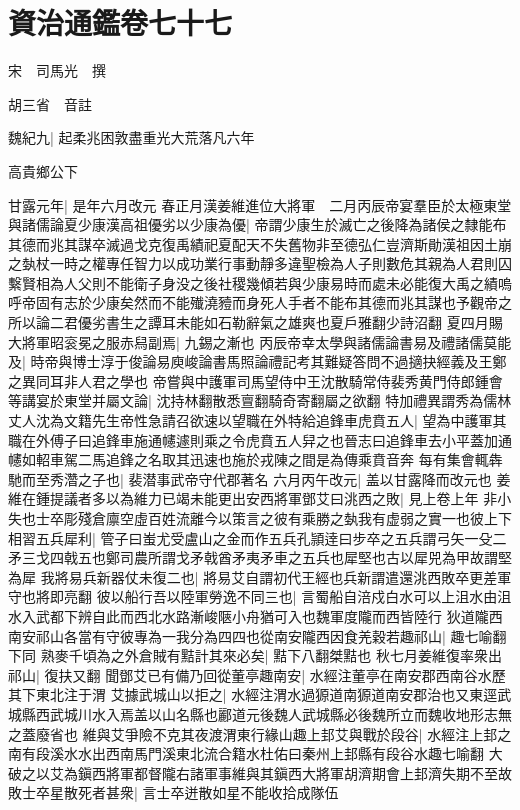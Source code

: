 \chapter{資治通鑑卷七十七}
宋　司馬光　撰

胡三省　音註

魏紀九|{
	起柔兆困敦盡重光大荒落凡六年}


高貴鄉公下

甘露元年|{
	是年六月改元}
春正月漢姜維進位大將軍　二月丙辰帝宴羣臣於太極東堂與諸儒論夏少康漢高祖優劣以少康為優|{
	帝謂少康生於滅亡之後降為諸侯之隸能布其德而兆其謀卒滅過戈克復禹績祀夏配天不失舊物非至德弘仁豈濟斯勛漢祖因土崩之埶杖一時之權專任智力以成功業行事動靜多違聖檢為人子則數危其親為人君則囚繫賢相為人父則不能衛子身没之後社稷幾傾若與少康易時而處未必能復大禹之績嗚呼帝固有志於少康矣然而不能殱澆豷而身死人手者不能布其德而兆其謀也予觀帝之所以論二君優劣書生之譚耳未能如石勒辭氣之雄爽也夏戶雅翻少詩沼翻}
夏四月賜大將軍昭衮冕之服赤舄副焉|{
	九錫之漸也}
丙辰帝幸太學與諸儒論書易及禮諸儒莫能及|{
	時帝與博士淳于俊論易庾峻論書馬照論禮記考其難疑答問不過擿抉經義及王鄭之異同耳非人君之學也}
帝嘗與中護軍司馬望侍中王沈散騎常侍裴秀黄門侍郎鍾會等講宴於東堂并屬文論|{
	沈持林翻散悉亶翻騎奇寄翻屬之欲翻}
特加禮異謂秀為儒林丈人沈為文籍先生帝性急請召欲速以望職在外特給追鋒車虎賁五人|{
	望為中護軍其職在外傅子曰追鋒車施通幰遽則乘之令虎賁五人舁之也晉志曰追鋒車去小平蓋加通幰如軺車駕二馬追鋒之名取其迅速也施於戎陳之間是為傳乘賁音奔}
每有集會輒犇馳而至秀濳之子也|{
	裴潜事武帝守代郡著名}
六月丙午改元|{
	盖以甘露降而改元也}
姜維在鍾提議者多以為維力已竭未能更出安西將軍鄧艾曰洮西之敗|{
	見上卷上年}
非小失也士卒彫殘倉廪空虛百姓流離今以策言之彼有乘勝之埶我有虚弱之實一也彼上下相習五兵犀利|{
	管子曰蚩尤受盧山之金而作五兵孔頴逹曰步卒之五兵謂弓矢一殳二矛三戈四戟五也鄭司農所謂戈矛戟酋矛夷矛車之五兵也犀堅也古以犀兕為甲故謂堅為犀}
我將易兵新器仗未復二也|{
	將易艾自謂初代王經也兵新謂遣還洮西敗卒更差軍守也將即亮翻}
彼以船行吾以陸軍勞逸不同三也|{
	言蜀船自涪戍白水可以上沮水由沮水入武都下辨自此而西北水路漸峻陿小舟猶可入也魏軍度隴而西皆陸行}
狄道隴西南安祁山各當有守彼專為一我分為四四也從南安隴西因食羌穀若趣祁山|{
	趣七喻翻下同}
熟麥千頃為之外倉賊有黠計其來必矣|{
	黠下八翻桀黠也}
秋七月姜維復率衆出祁山|{
	復扶又翻}
聞鄧艾已有備乃回從董亭趣南安|{
	水經注董亭在南安郡西南谷水歷其下東北注于渭}
艾據武城山以拒之|{
	水經注渭水過獂道南獂道南安郡治也又東逕武城縣西武城川水入焉盖以山名縣也酈道元後魏人武城縣必後魏所立而魏收地形志無之蓋廢省也}
維與艾爭險不克其夜渡渭東行緣山趣上邽艾與戰於段谷|{
	水經注上邽之南有段溪水水出西南馬門溪東北流合籍水杜佑曰秦州上邽縣有段谷水趣七喻翻}
大破之以艾為鎭西將軍都督隴右諸軍事維與其鎭西大將軍胡濟期會上邽濟失期不至故敗士卒星散死者甚衆|{
	言士卒迸散如星不能收拾成隊伍}
